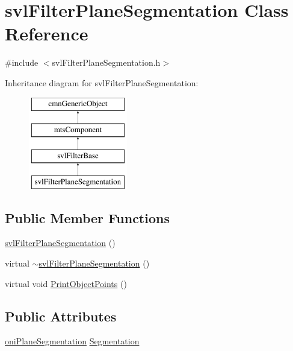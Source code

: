 \hypertarget{classsvl_filter_plane_segmentation}{}\section{svl\+Filter\+Plane\+Segmentation Class Reference}
\label{classsvl_filter_plane_segmentation}


{\ttfamily \#include $<$svl\+Filter\+Plane\+Segmentation.\+h$>$}

Inheritance diagram for svl\+Filter\+Plane\+Segmentation\+:\begin{figure}[H]
\begin{center}
\leavevmode
\includegraphics[height=4.000000cm]{de/dc1/classsvl_filter_plane_segmentation}
\end{center}
\end{figure}
\subsection*{Public Member Functions}
\begin{DoxyCompactItemize}
\item 
\hyperlink{classsvl_filter_plane_segmentation_a8902a2dd61d39b1949c1695362f33420}{svl\+Filter\+Plane\+Segmentation} ()
\item 
virtual \hyperlink{classsvl_filter_plane_segmentation_a5c07d965e9f5b5d06511c37b5d2fa249}{$\sim$svl\+Filter\+Plane\+Segmentation} ()
\item 
virtual void \hyperlink{classsvl_filter_plane_segmentation_a0892513338b36f99cd07ee15941b644f}{Print\+Object\+Points} ()
\end{DoxyCompactItemize}
\subsection*{Public Attributes}
\begin{DoxyCompactItemize}
\item 
\hyperlink{classoni_plane_segmentation}{oni\+Plane\+Segmentation} \hyperlink{classsvl_filter_plane_segmentation_a20b68f97c3fe7cf49b3fa38d402fdb7d}{Segmentation}
\end{DoxyCompactItemize}
